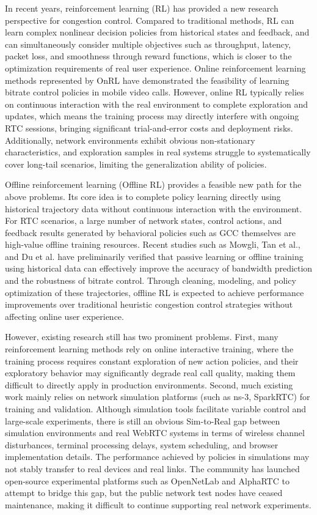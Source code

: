 {In recent years, reinforcement learning (RL) has provided a new research perspective for congestion control. Compared to traditional methods, RL can learn complex nonlinear decision policies from historical states and feedback, and can simultaneously consider multiple objectives such as throughput, latency, packet loss, and smoothness through reward functions, which is closer to the optimization requirements of real user experience. Online reinforcement learning methods represented by OnRL have demonstrated the feasibility of learning bitrate control policies in mobile video calls. However, online RL typically relies on continuous interaction with the real environment to complete exploration and updates, which means the training process may directly interfere with ongoing RTC sessions, bringing significant trial-and-error costs and deployment risks. Additionally, network environments exhibit obvious non-stationary characteristics, and exploration samples in real systems struggle to systematically cover long-tail scenarios, limiting the generalization ability of policies.

Offline reinforcement learning (Offline RL) provides a feasible new path for the above problems. Its core idea is to complete policy learning directly using historical trajectory data without continuous interaction with the environment. For RTC scenarios, a large number of network states, control actions, and feedback results generated by behavioral policies such as GCC themselves are high-value offline training resources. Recent studies such as Mowgli, Tan et al., and Du et al. have preliminarily verified that passive learning or offline training using historical data can effectively improve the accuracy of bandwidth prediction and the robustness of bitrate control. Through cleaning, modeling, and policy optimization of these trajectories, offline RL is expected to achieve performance improvements over traditional heuristic congestion control strategies without affecting online user experience.

However, existing research still has two prominent problems. First, many reinforcement learning methods rely on online interactive training, where the training process requires constant exploration of new action policies, and their exploratory behavior may significantly degrade real call quality, making them difficult to directly apply in production environments. Second, much existing work mainly relies on network simulation platforms (such as ns-3, SparkRTC) for training and validation. Although simulation tools facilitate variable control and large-scale experiments, there is still an obvious Sim-to-Real gap between simulation environments and real WebRTC systems in terms of wireless channel disturbances, terminal processing delays, system scheduling, and browser implementation details. The performance achieved by policies in simulations may not stably transfer to real devices and real links. The community has launched open-source experimental platforms such as OpenNetLab and AlphaRTC to attempt to bridge this gap, but the public network test nodes have ceased maintenance, making it difficult to continue supporting real network experiments.

}
